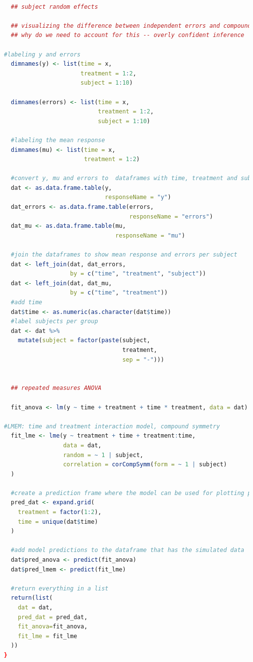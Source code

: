 \documentclass[
]{article}
\begin{document}
\begin{lstlisting}[language=R]
  
  ## subject random effects
  
  ## visualizing the difference between independent errors and compound symmetry
  ## why do we need to account for this -- overly confident inference
  
#labeling y and errors  
  dimnames(y) <- list(time = x, 
                      treatment = 1:2, 
                      subject = 1:10)

  dimnames(errors) <- list(time = x, 
                           treatment = 1:2, 
                           subject = 1:10)
  
  #labeling the mean response
  dimnames(mu) <- list(time = x, 
                       treatment = 1:2)
  
  #convert y, mu and errors to  dataframes with time, treatment and subject columns
  dat <- as.data.frame.table(y, 
                             responseName = "y")
  dat_errors <- as.data.frame.table(errors, 
                                    responseName = "errors")
  dat_mu <- as.data.frame.table(mu, 
                                responseName = "mu")
  
  #join the dataframes to show mean response and errors per subject
  dat <- left_join(dat, dat_errors, 
                   by = c("time", "treatment", "subject"))
  dat <- left_join(dat, dat_mu, 
                   by = c("time", "treatment"))
  #add time
  dat$time <- as.numeric(as.character(dat$time))
  #label subjects per group
  dat <- dat %>%
    mutate(subject = factor(paste(subject, 
                                  treatment, 
                                  sep = "-")))
  
  
  ## repeated measures ANOVA 
  
  fit_anova <- lm(y ~ time + treatment + time * treatment, data = dat)
  
#LMEM: time and treatment interaction model, compound symmetry 
  fit_lme <- lme(y ~ treatment + time + treatment:time,
                 data = dat,
                 random = ~ 1 | subject,
                 correlation = corCompSymm(form = ~ 1 | subject)
  )
  
  #create a prediction frame where the model can be used for plotting purposes
  pred_dat <- expand.grid(
    treatment = factor(1:2), 
    time = unique(dat$time)
  )
  
  #add model predictions to the dataframe that has the simulated data
  dat$pred_anova <- predict(fit_anova)
  dat$pred_lmem <- predict(fit_lme)

  #return everything in a list
  return(list(
    dat = dat,
    pred_dat = pred_dat,
    fit_anova=fit_anova,
    fit_lme = fit_lme
  ))
}
\end{lstlisting}
\end{document}
